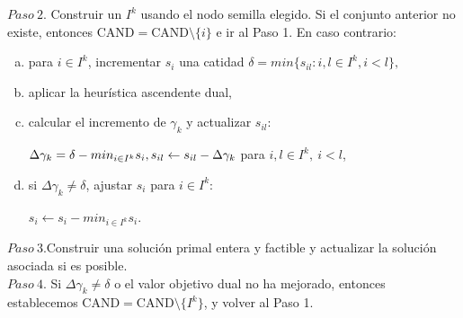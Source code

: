 \documentclass[twoside,12pt]{article}
\begin{document}
$Paso\ 2$. Construir un $I^{k}$ usando el nodo semilla elegido. Si el conjunto anterior no existe, entonces $\text{CAND}=\text{CAND}\setminus\{i\}$ e ir al Paso 1. En caso contrario:
\begin{enumerate}[a.]
    \item para $i\in I^{k}$, incrementar $s_{i}$ una catidad $\delta=min\{s_{il}:i,l\in I^{k},i<l\},$
    \item aplicar la heurística ascendente dual,
    \item calcular el incremento de $\gamma_{k}$ y actualizar $s_{il}$:
        \begin{center}
        $\Delta\gamma_{k}=\delta-min_{i\in I^{k}}s_{i},\newline
        s_{il}\leftarrow s_{il}-\Delta\gamma_{k}$ para $i,l\in I^{k},\ i<l$,
        \end{center}
    \item si $\Delta\gamma_{k}\neq\delta$, ajustar $s_{i}$ para $i\in I^{k}$:
        \begin{center}
        $s_{i}\leftarrow s_{i}-min_{i\in I^{k}} s_{i}$.
        \end{center}
\end{enumerate}


$Paso\ 3$.Construir una solución primal entera y factible y actualizar la solución asociada si es posible.\\

$Paso\ 4$. Si $\Delta\gamma_{k}\neq\delta$ o el valor objetivo dual no ha mejorado, entonces establecemos $\text{CAND}=\text{CAND}\setminus\{I^{k}\}$, y volver al Paso 1.\\
\end{document}
